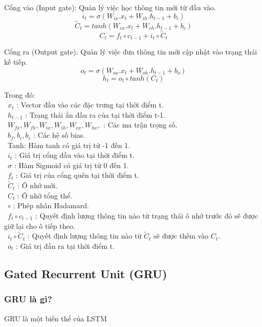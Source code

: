\documentclass[conference]{IEEEtran}
\begin{document}
Cổng vào (Input gate): Quản lý việc học thông tin mới từ đầu vào.
\[i_t=\sigma(W_{ix}.x_t+W_{ih}.h_{t-1}+b_i)\]
\[{\widetilde{C}}_t=tanh\left(W_{cx}.x_t+W_{ch}.h_{t-1}+b_c\right)\]
\[C_t=f_t\circ c_{t-1}+i_t\circ{\widetilde{C}}_t\]

Cổng ra (Output gate): Quản lý việc đưa thông tin mới cập nhật vào trạng thái kế tiếp.
\[o_t=\sigma(W_{ox}.x_t+W_{oh}.h_{t-1}+b_o)\]
\[h_t=o_t\circ tanh(C_t)\]

Trong đó:\\
\indent\textbullet\ \(x_t\) : Vector đầu vào các đặc trưng tại thời điểm t.\\
\indent\textbullet\ \(h_{t-1}\) : Trạng thái ẩn đầu ra của tại thời điểm t-1.\\
\indent\textbullet\ \(W_{fx},W_{fh},W_{ix},W_{ih},W_{cx},W_{hx},\) : Các ma trận trọng số.\\
\indent\textbullet\ \(b_f,b_i, b_c \) : Các hệ số bias.\\
\indent\textbullet\ Tanh: Hàm tanh có giá trị tử -1 đến 1.\\
\indent\textbullet\ \(i_t\) : Giá trị cổng đầu vào tại thời điểm t.\\
\indent\textbullet\ \(\sigma\) : Hàm Sigmoid có giá trị tử 0 đến 1.\\
\indent\textbullet\ \(f_t\) : Giá trị của cổng quên tại thời điểm t.\\
\indent\textbullet\ \(\widetilde{C}_t \) : Ô nhớ mới.\\
\indent\textbullet\ \(C_t \) : Ô nhớ tổng thể.\\
\indent\textbullet\ \(\circ\) : Phép nhân Hadamard.\\
\indent\textbullet\ \(f_t\circ c_{t-1}\) : Quyết định lượng thông tin nào từ trạng thái ô nhớ trước đó sẽ được giữ lại cho ô tiếp theo.\\
\indent\textbullet\ \(i_t\circ{\widetilde{C}}_t\) : Quyết định lượng thông tin nào từ \({\widetilde{C}}_t\) sẽ được thêm vào \(C_t\).\\
\indent\textbullet\ \(o_t \) : Giá trị đầu ra tại thời điểm t.


\subsection{Gated Recurrent Unit (GRU)}
\subsubsection{GRU là gì?}
GRU là một biến thể của LSTM
\end{document}
